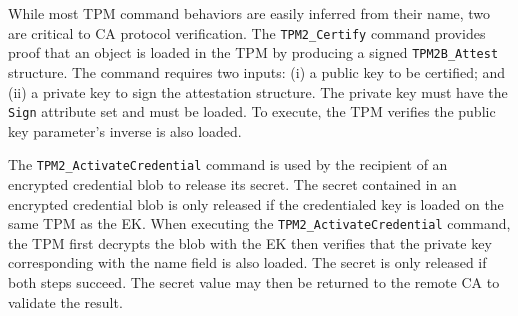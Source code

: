 \documentclass[runningheads]{llncs}
\begin{document}

While most TPM command behaviors are easily inferred from their name,
two are critical to CA protocol verification.  The \verb|TPM2_Certify|
command provides proof that an object is loaded in the TPM by
producing a signed \verb|TPM2B_Attest| structure. The command requires
two inputs: (i) a public key to be certified; and (ii) a private key
to sign the attestation structure. The private key must have the
\verb|Sign| attribute set and must be loaded. To execute, the TPM
verifies the public key parameter's inverse is also loaded.



The \verb|TPM2_ActivateCredential| command is used by the recipient of
an encrypted credential blob to release its secret.  The secret
contained in an encrypted credential blob is only released if the
credentialed key is loaded on the same TPM as the EK.  When executing
the \verb|TPM2_ActivateCredential| command, the TPM first decrypts the
blob with the EK then verifies that the private key corresponding with
the name field is also loaded. The secret is only released if both
steps succeed. The secret value may then be returned to the remote CA
to validate the result.

\end{document}
